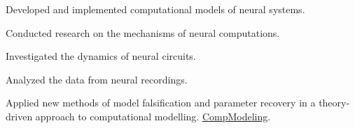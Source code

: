 \documentclass[]{plushcv}
\begin{document}
\begin{minipage}[t]{0.70\textwidth}
\sectionsep
{}
\begin{tightemize}
\item Developed and implemented computational models of neural systems.
\item Conducted research on the mechanisms of neural computations.
\item Investigated the dynamics of neural circuits.
\item Analyzed the data from neural recordings.
\item Applied new methods of model falsification and parameter recovery in a theory-driven approach to computational modelling. \href{https://github.com/munoztd0/Computational-Modelling}{\underline{CompModeling}}.
\end{tightemize}
\sectionsep






\end{minipage}
\end{document}
